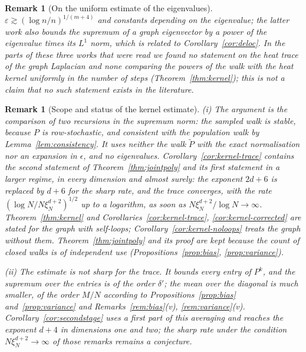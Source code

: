 \documentclass[11pt,a4paper]{article}
\theoremstyle{stmt}
\theoremstyle{defn}
\theoremstyle{rmk}
\newtheorem{remark}[theorem]{Remark}
\numberwithin{equation}{section}
\begin{document}
{\begin{remark}[On the uniform estimate of the eigenvalues]
$\varepsilon\gtrsim(\log n/n)^{1/(m+4)}$ and constants depending on the eigenvalue; the latter work also bounds the supremum of a graph eigenvector by a power of the eigenvalue times its $L^1$ norm, which is related to Corollary~\ref{cor:deloc}. In the parts of these three works that were read we found no statement on the heat trace of the graph Laplacian and none comparing the powers of the walk with the heat kernel uniformly in the number of steps (Theorem~\ref{thm:kernel}); this is not a claim that no such statement exists in the literature.
\end{remark}

\begin{remark}[Scope and status of the kernel estimate]\label{rem:kernel}
(i) The argument is the comparison of two recursions in the supremum norm: the sampled walk is stable, because $P$ is row-stochastic, and consistent with the population walk by Lemma~\ref{lem:consistency}. It uses neither the walk $\tilde P$ with the exact normalisation nor an expansion in $\epsilon$, and no eigenvalues. Corollary~\ref{cor:kernel-trace} contains the second statement of Theorem~\ref{thm:jointpoly} and its first statement in a larger regime, in every dimension and almost surely: the exponent $2d+6$ is replaced by $d+6$ for the sharp rate, and the trace converges, with the rate $(\log N/N\xi_N^{d+2})^{1/2}$ up to a logarithm, as soon as $N\xi_N^{d+2}/\log N\to\infty$. Theorem~\ref{thm:kernel} and Corollaries~\ref{cor:kernel-trace}, \ref{cor:kernel-corrected} are stated for the graph with self-loops; Corollary~\ref{cor:kernel-noloops} treats the graph without them. Theorem~\ref{thm:jointpoly} and its proof are kept because the count of closed walks is of independent use (Propositions~\ref{prop:bias}, \ref{prop:variance}).

(ii) The estimate is not sharp for the trace. It bounds every entry of $P^k$, and the supremum over the entries is of the order $\delta'$; the mean over the diagonal is much smaller, of the order $M/N$ according to Propositions~\ref{prop:bias} and~\ref{prop:variance} and Remarks~\ref{rem:bias}(v), \ref{rem:variance}(v). Corollary~\ref{cor:secondstage} uses a first part of this averaging and reaches the exponent $d+4$ in dimensions one and two; the sharp rate under the condition $N\xi_N^{d+2}\to\infty$ of those remarks remains a conjecture.


\end{remark}}
\end{document}
